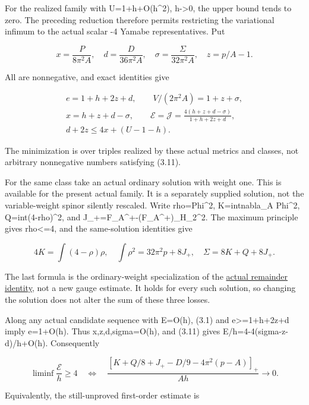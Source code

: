 \documentclass[
  10pt,
]{article}
\begin{document}
For the realized family with U=1+h+O(h\^{}2), h-\textgreater0, the upper
bound tends to zero. The preceding reduction therefore permits
restricting the variational infimum to the actual scalar -4 Yamabe
representatives. Put

\[
 x=\frac{P}{8\pi^2A},\quad d=\frac{D}{36\pi^2A},\quad
 \sigma=\frac{\Sigma}{32\pi^2A},\quad z=p/A-1.
\]

All are nonnegative, and exact identities give

\[
\begin{gathered}
 e=1+h+2z+d,\qquad V/(2\pi^2 A)=1+z+\sigma,\\
 x=h+z+d-\sigma,\qquad
 \mathcal E=\mathcal J=\frac{4(h+z+d-\sigma)}{1+h+2z+d},\\
                 d+2z\le4x+(U-1-h).
\end{gathered}                                                     \tag{3.11}
\]

The minimization is over triples realized by these actual metrics and
classes, not arbitrary nonnegative numbers satisfying (3.11).

For the same class take an actual ordinary solution with weight one.
This is available for the present actual family. It is a separately
supplied solution, not the variable-weight spinor silently rescaled.
Write rho=\textbar Phi\textbar\^{}2, K=int\textbar nabla\_A
Phi\textbar\^{}2, Q=int(4-rho)\^{}2, and
J\_+=\textbar\textbar F\_A\^{}+-(F\_A\^{}+)\_H\textbar\textbar\_2\^{}2.
The maximum principle gives rho\textless=4, and the same-solution
identities give

\[
 4K=\int(4-\rho)\rho,\quad
 \int\rho^2=32\pi^2p+8J_+,\quad
 \boxed{\Sigma=8K+Q+8J_+.}                             \tag{3.12}
\]

The last formula is the ordinary-weight specialization of the
\href{20260926_actual_topological_cost.md}{actual remainder identity},
not a new gauge estimate. It holds for every such solution, so changing
the solution does not alter the sum of these three losses.

Along any actual candidate sequence with E=O(h), (3.1) and
e\textgreater=1+h+2z+d imply e=1+O(h). Thus x,z,d,sigma=O(h), and (3.11)
gives E/h=4-4(sigma-z-d)/h+O(h). Consequently

\[
 \boxed{\liminf\frac{\mathcal E}{h}\ge4
 \quad\Longleftrightarrow\quad
 \frac{[K+Q/8+J_+-D/9-4\pi^2(p-A)]_+}{Ah}\longrightarrow0.}
                                                               \tag{3.13}
\]

Equivalently, the still-unproved first-order estimate is
\end{document}

